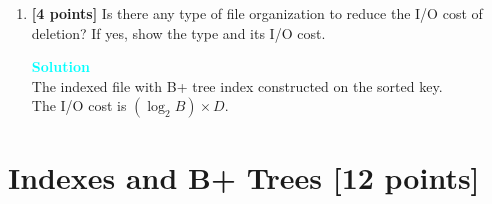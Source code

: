 \documentclass[10pt]{article}
\newenvironment{solution}
    { \begin{mdframed}[backgroundcolor=gray!10] \textcolor{cyan}{\textbf{Solution}} \\}
    {  \end{mdframed}}
\begin{document}
\begin{enumerate}
\begin{solution}
\begin{itemize}
			and the second part $B \times D$ is the average cost of shifting the rest pages by 1 record. 
		\end{itemize}
	\end{solution}
	\item \textbf{[4 points]}
	Is there any type of file organization to reduce the I/O cost of deletion? If yes, show the type and its I/O cost.  
	\begin{solution}
		The indexed file with B+ tree index constructed on the sorted key.\\
		The I/O cost is $(\log_2 B) \times D$.
	\end{solution}
\end{enumerate}




\newpage
\section{Indexes and B+ Trees \textbf{[12 points]}}
\end{document}
